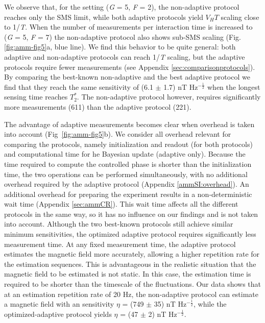 We observe that, for the setting (\textit{G} = 5, \textit{F} = 2), the non-adaptive protocol reaches only the SMS limit, while both adaptive protocols yield $V_H T$ scaling close to 1/\textit{T}. When the number of measurements per interaction time is increased to (\textit{G} = 5, \textit{F} = 7) the non-adaptive protocol also shows sub-SMS scaling (Fig.\,\ref{fig:amm-fig5}a, blue line). We find this behavior to be quite general: both adaptive and non-adaptive protocols can reach 1/\textit{T} scaling, but the adaptive protocols require fewer measurements (see Appendix \ref{sec:comparisonprotocols}). By comparing the best-known non-adaptive and the best adaptive protocol we find that they reach the same sensitivity of (6.1 $\pm$ 1.7) nT Hz$^{-\frac{1}{2}}$ when the longest sensing time reaches $T_2^*$. The non-adaptive protocol however, requires significantly more measurements (611) than the adaptive protocol (221).

The advantage of adaptive measurements becomes clear when overhead is taken into account (Fig \,\ref{fig:amm-fig5}b). We consider all overhead relevant for comparing the protocols, namely initialization and readout (for both protocols) and computational time for he Bayesian update (adaptive only). Because the time required to compute the controlled phase is shorter than the initialization time, the two operations can be performed simultaneously, with no additional overhead required by the adaptive protocol (Appendix \ref{ammSI:overhead}). An additional overhead for preparing the experiment results in a non-deterministic wait time (Appendix \ref{sec:ammCR}). This wait time affects all the different protocols in the same way, so it has no influence on our findings and is not taken into account. Although the two best-known protocols still achieve similar minimum sensitivities, the optimized adaptive protocol requires significantly less measurement time. At any fixed measurement time, the adaptive protocol estimates the magnetic field more accurately, allowing a higher repetition rate for the estimation sequences. This is advantageous in the realistic situation that the magnetic field to be estimated is not static. In this case, the estimation time is required to be shorter than the timescale of the fluctuations. Our data shows that at an estimation repetition rate of 20 Hz, the non-adaptive protocol can estimate a magnetic field with an sensitivity $\eta$ = (749 $\pm$ 35) nT Hz$^{-\frac{1}{2}}$, while the optimized-adaptive protocol yields $\eta$ = (47 $\pm$ 2) nT Hz$^{-\frac{1}{2}}$.

